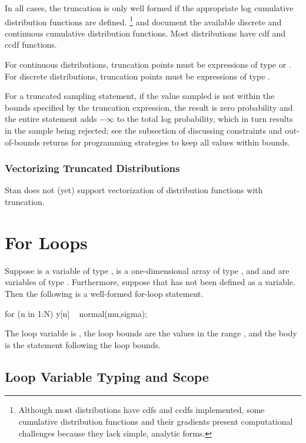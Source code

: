 In all cases, the truncation is only well formed if the
appropriate log cumulative distribution functions are defined.%
%
\footnote{Although most distributions have cdfs and ccdfs implemented,
  some cumulative distribution functions and their gradients present
  computational challenges because they lack simple, analytic forms.}
%
 and
 document the available discrete
and continuous cumulative distribution functions.  Most distributions
have cdf and ccdf functions.

For continuous distributions, truncation points must be expressions of
type  or .  For discrete distributions, truncation
points must be expressions of type .

For a truncated sampling statement, if the value sampled is not within
the bounds specified by the truncation expression, the result is zero
probability and the entire statement adds $-\infty$ to the total log
probability, which in turn results in the sample being rejected; see
the subsection of  discussing constraints
and out-of-bounds returns for programming strategies to keep
all values within bounds.

\subsubsection{Vectorizing Truncated Distributions}

Stan does not (yet) support vectorization of distribution functions
with truncation.


\section{For Loops}

Suppose
 is a variable of type ,  is a
one-dimensional array of type , and  and
 are variables of type .  Furthermore, suppose
that  has not been defined as a variable. Then the following
is a well-formed for-loop statement.
%
\begin{stancode}
for (n in 1:N) {
  y[n] ~ normal(mu,sigma);
}
\end{stancode}
%
The loop variable is , the loop bounds are the values in the
range , and the body is the statement following the
loop bounds.

\subsection{Loop Variable Typing and Scope}

